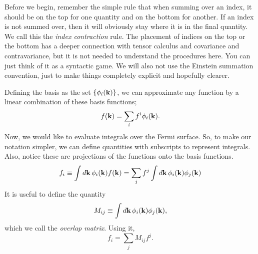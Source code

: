 \documentclass[12pt]{article}
\begin{document}
Before we begin, remember the simple rule that when summing over an index, it should be on the top
for one quantity and on the bottom for another. If an index is not summed over, then it will
obviously stay where it is in the final quantity. We call this the \emph{index contraction} rule.
The placement of indices on the top or the bottom has a deeper connection with tensor calculus and
covariance and contravariance, but it is not needed to understand the procedures here. You can just
think of it as a syntactic game. We will also not use the Einstein summation convention, just to
make things completely explicit and hopefully clearer.

Defining the basis as the set $\{\phi_i(\vb{k})\}$, we can approximate any function by a linear
combination of these basis functions;
\begin{equation}
    f(\vb{k}) = \sum_i f^{i}\phi_i(\vb{k}). \label{eq:vector}
\end{equation}
Now, we would like to evaluate integrals over the Fermi surface. So, to make our notation simpler,
we can define quantities with subscripts to represent integrals. Also, notice these are projections
of the functions onto the basis functions.
\begin{equation}
    f_i \equiv \int\dd{\vb{k}} \phi_i(\vb{k}) f(\vb{k})
    = \sum_j f^j \int\dd{\vb{k}} \phi_i(\vb{k}) \phi_j(\vb{k})
    \label{eq:integral_vector}
\end{equation}
It is useful to define the quantity
\begin{equation}
    M_{ij} \equiv \int \dd{\vb{k}} \phi_i(\vb{k}) \phi_j(\vb{k}),
    \label{eq:overlap}
\end{equation}
which we call the \emph{overlap matrix}. Using it,
\begin{equation}
    f_i = \sum_j M_{ij} f^j.
    \label{eq:lowering_vector}
\end{equation}
\end{document}
